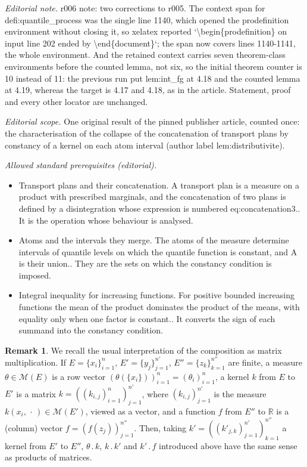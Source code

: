 \documentclass[10pt,a4paper]{article}
\newcommand{\ldot}{\mathbin{.}}
\theoremstyle{plain}
\theoremstyle{definition}
\newtheorem{rem}[them]{Remark}
\newcommand{\m}{\mathcal{M}}
\newcommand{\R}{\mathbb{R}}
\begin{document}
\noindent\textit{Editorial note.} r006 note: two corrections to r005. The context span for defi:quantile\_process was the single line 1140, which opened the prodefinition environment without closing it, so xelatex reported `\textbackslash{}begin\{prodefinition\} on input line 202 ended by \textbackslash{}end\{document\}`; the span now covers lines 1140-1141, the whole environment. And the retained context carries seven theorem-class environments before the counted lemma, not six, so the initial theorem counter is 10 instead of 11: the previous run put lem:int\_fg at 4.18 and the counted lemma at 4.19, whereas the target is 4.17 and 4.18, as in the article. Statement, proof and every other locator are unchanged.\par\medskip
\noindent\textit{Editorial scope.} One original result of the pinned publisher article, counted once: the characterisation of the collapse of the concatenation of transport plans by constancy of a kernel on each atom interval (author label lem:distributivite).\par\medskip
\noindent\textit{Allowed standard prerequisites (editorial).}\begin{itemize}
\item Transport plans and their concatenation. A transport plan is a measure on a product with prescribed marginals, and the concatenation of two plans is defined by a disintegration whose expression is numbered eq:concatenation3.. It is the operation whose behaviour is analysed.
\item Atoms and the intervals they merge. The atoms of the measure determine intervals of quantile levels on which the quantile function is constant, and A is their union.. They are the sets on which the constancy condition is imposed.
\item Integral inequality for increasing functions. For positive bounded increasing functions the mean of the product dominates the product of the means, with equality only when one factor is constant.. It converts the sign of each summand into the constancy condition.
\end{itemize}\medskip
\begin{rem}\label{rem:matrix}
We recall the usual interpretation of the composition as matrix multiplication. If $E=\{x_i\}_{i=1}^{n}$, $E'=\{y_j\}_{j=1}^{n'}$, $E''=\{z_k\}_{k=1}^{n''}$ are finite, a measure $\theta\in\m(E)$ is a row vector $(\theta(\{x_i\}))_{i=1}^{n}=(\theta_i)_{i=1}^{n}$, a kernel $k$ from $E$ to $E'$ is a matrix $k=((k_{i,j})_{i=1}^{n})_{j=1}^{n'}$, where $(k_{i,j})_{j=1}^{n'}$ is the measure $k(x_i,\,\cdot\,)\in\m(E')$, viewed as a vector, and a function $f$ from $E''$ to $\R$ is a (column) vector $f=(f(z_j))_{j=1}^{n''}$. Then, taking $k'=((k'_{j,k})_{j=1}^{n'})_{k=1}^{n''}$ a kernel from $E'$ to $E''$, $\theta\ldot k$, $k\ldot k'$ and $k'\ldot f$ introduced above have the same sense as products of matrices.
\end{rem}
\end{document}
